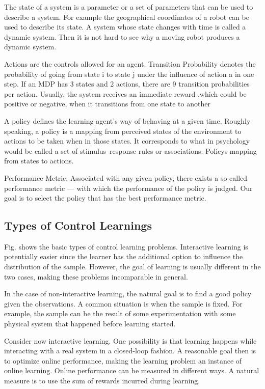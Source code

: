 The state of a system is a parameter or a set of parameters that can be used to describe a system. For example the geographical coordinates of a robot can be used to
describe its state. A system whose state changes with time is called a dynamic system. Then it is not hard to see why a moving robot produces a dynamic system.

Actions are the controls allowed for an agent. Transition Probability denotes the probability of going from state i to state j under the influence of action a in one step. If an MDP has 3 states and 2 actions, there are 9 transition probabilities per action. Usually, the system receives an immediate reward ,which could be positive or negative, when it transitions from one state to another

A policy defines the learning agent’s way of behaving at a given time. Roughly speaking, a policy is a mapping from perceived states of the environment
to actions to be taken when in those states. It corresponds to what in
psychology would be called a set of stimulus–response rules or associations.  Policys mapping from states to actions.

Performance Metric: Associated with any given policy, there exists a so-called performance
metric — with which the performance of the policy is judged. Our goal is to select the policy
that has the best performance metric. 

\subsection{Types of Control Learnings}


Fig. shows the basic types of control learning problems. Interactive learning is potentially easier since the learner has the additional option to influence the distribution of the sample. However, the goal of
learning is usually different in the two cases, making these problems incomparable in general.

In the case of non-interactive learning, the natural goal is to find a good policy given the observations.
A common situation is when the sample is fixed. For example, the sample can be the result of some experimentation with some physical system that happened before learning started. 

Consider now interactive learning. One possibility is that learning happens while interacting
with a real system in a closed-loop fashion. A reasonable goal then is to optimize online performance,
making the learning problem an instance of online learning. Online performance
can be measured in different ways. A natural measure is to use the sum of rewards incurred
during learning. 




